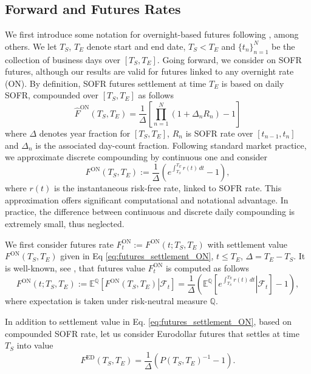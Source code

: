 \documentclass[pdftex,11pt,a4paper] {article}
\begin{document}
\subsection{Forward and Futures Rates}

We first introduce some notation for overnight-based futures following \cite{Lyashenko2019}, among others. We let $T_S$, $T_E$ denote start and end date, $T_S<T_E$ and $\{t_n\}_{n=1}^N$ be the collection of business days over $[T_S,T_E]$. Going forward, we consider on SOFR futures, although our results are valid for futures linked to any overnight rate (ON). By definition, SOFR futures settlement at time $T_E$ is based on daily SOFR, compounded over $[T_S,T_E]$ as follows
\begin{equation}
\hat{F}^{\mathrm{ON}}(T_S,T_E) = \frac{1}{\Delta}\left[\prod_{n=1}^{N}\left(1+\Delta_nR_n\right)-1\right]
\end{equation}
where $\Delta$ denotes year fraction for $[T_S,T_E]$, $R_n$ is SOFR rate over $[t_{n-1},t_n]$ and $\Delta_n$ is the associated day-count fraction. Following standard market practice, we approximate discrete compounding by continuous one and consider
\begin{equation}\label{eq:futures_settlement_ON}
F^{\mathrm{ON}}(T_S,T_E):=\frac{1}{\Delta}\left(e^{\int_{T_S}^{T_E}r(t)\,dt}-1\right),
\end{equation}
where $r(t)$ is the instantaneous risk-free rate, linked to SOFR rate. This approximation offers significant computational and notational advantage. In practice, the difference between continuous and discrete daily compounding is extremely small, thus neglected. 

We first consider futures rate $F^{\mathrm{ON}}_t:=F^{\mathrm{ON}}(t;T_S,T_E)$ with settlement value $F^{\mathrm{ON}}(T_S,T_E)$ given in Eq \eqref{eq:futures_settlement_ON}, $t\le T_E$, $\Delta=T_E-T_S$. It is well-known, see \cite{HuntKennedy2004}, that futures value $F^{\mathrm{ON}}_t$ is computed as follows
\begin{equation}\label{eq:marting_futures_ON}
F^{\mathrm{ON}}(t;T_S,T_E):=\mathbb{E}^{\mathbb{Q}}\left[\left.F^{\mathrm{ON}}(T_S,T_E)\right|\mathcal{F}_t\right]=
\frac{1}{\Delta}\left(\mathbb{E}^{\mathbb{Q}}\left[\left.e^{\int_{T_S}^{T_E}r(t)\,dt}\right|\mathcal{F}_t\right]-1\right),
\end{equation}
where expectation is taken under risk-neutral measure $\mathbb{Q}$.

In addition to settlement value in Eq. \eqref{eq:futures_settlement_ON}, based on compounded SOFR rate, let us consider Eurodollar futures that settles at time $T_S$ into value
\begin{equation}\label{eq:futures_settlement_ED}
F^{\mathrm{ED}}(T_S,T_E)=\frac{1}{\Delta}\left(P(T_S,T_E)^{-1}-1\right).
\end{equation}
\end{document}
